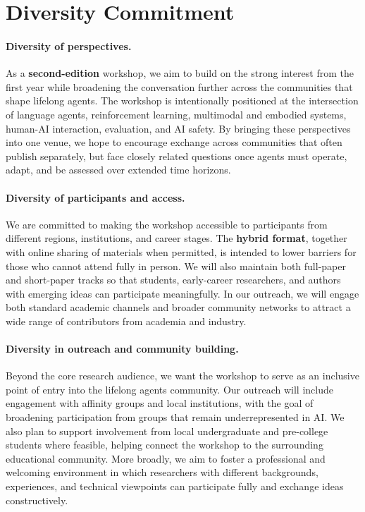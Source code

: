 
\section{Diversity Commitment}

\paragraph{Diversity of perspectives.}
As a \textbf{second-edition} workshop, we aim to build on the strong interest from the first year while broadening the conversation further across the communities that shape lifelong agents. The workshop is intentionally positioned at the intersection of language agents, reinforcement learning, multimodal and embodied systems, human-AI interaction, evaluation, and AI safety. By bringing these perspectives into one venue, we hope to encourage exchange across communities that often publish separately, but face closely related questions once agents must operate, adapt, and be assessed over extended time horizons.

\paragraph{Diversity of participants and access.}
We are committed to making the workshop accessible to participants from different regions, institutions, and career stages. The \textbf{hybrid format}, together with online sharing of materials when permitted, is intended to lower barriers for those who cannot attend fully in person. We will also maintain both full-paper and short-paper tracks so that students, early-career researchers, and authors with emerging ideas can participate meaningfully. In our outreach, we will engage both standard academic channels and broader community networks to attract a wide range of contributors from academia and industry.

\paragraph{Diversity in outreach and community building.}
Beyond the core research audience, we want the workshop to serve as an inclusive point of entry into the lifelong agents community. Our outreach will include engagement with affinity groups and local institutions, with the goal of broadening participation from groups that remain underrepresented in AI. We also plan to support involvement from local undergraduate and pre-college students where feasible, helping connect the workshop to the surrounding educational community. More broadly, we aim to foster a professional and welcoming environment in which researchers with different backgrounds, experiences, and technical viewpoints can participate fully and exchange ideas constructively.

